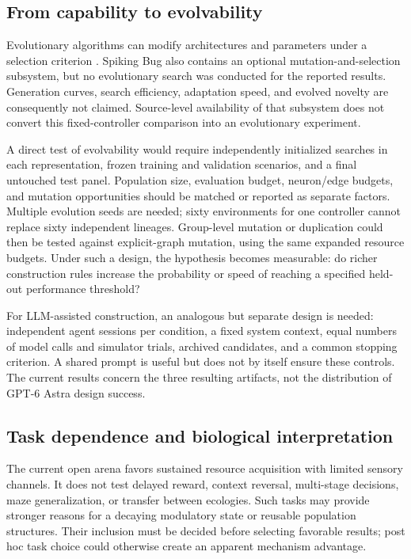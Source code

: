 \documentclass[11pt]{article}
\begin{document}
\subsection{From capability to evolvability}
Evolutionary algorithms can modify architectures and parameters under a selection criterion \citep{floreano2008}. Spiking Bug also contains an optional mutation-and-selection subsystem, but no evolutionary search was conducted for the reported results. Generation curves, search efficiency, adaptation speed, and evolved novelty are consequently not claimed. Source-level availability of that subsystem does not convert this fixed-controller comparison into an evolutionary experiment.

A direct test of evolvability would require independently initialized searches in each representation, frozen training and validation scenarios, and a final untouched test panel. Population size, evaluation budget, neuron/edge budgets, and mutation opportunities should be matched or reported as separate factors. Multiple evolution seeds are needed; sixty environments for one controller cannot replace sixty independent lineages. Group-level mutation or duplication could then be tested against explicit-graph mutation, using the same expanded resource budgets. Under such a design, the hypothesis becomes measurable: do richer construction rules increase the probability or speed of reaching a specified held-out performance threshold?

For LLM-assisted construction, an analogous but separate design is needed: independent agent sessions per condition, a fixed system context, equal numbers of model calls and simulator trials, archived candidates, and a common stopping criterion. A shared prompt is useful but does not by itself ensure these controls. The current results concern the three resulting artifacts, not the distribution of GPT-6 Astra design success.

\subsection{Task dependence and biological interpretation}
The current open arena favors sustained resource acquisition with limited sensory channels. It does not test delayed reward, context reversal, multi-stage decisions, maze generalization, or transfer between ecologies. Such tasks may provide stronger reasons for a decaying modulatory state or reusable population structures. Their inclusion must be decided before selecting favorable results; post hoc task choice could otherwise create an apparent mechanism advantage.
\end{document}
